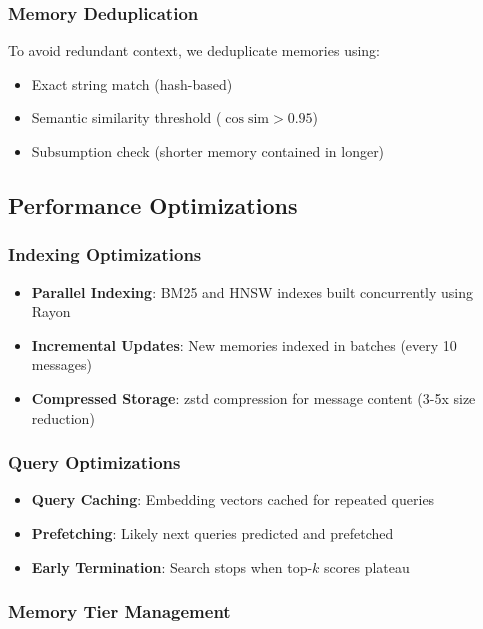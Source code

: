 \subsubsection{Memory Deduplication}

To avoid redundant context, we deduplicate memories using:
\begin{itemize}
    \item Exact string match (hash-based)
    \item Semantic similarity threshold ($\cos \text{sim} > 0.95$)
    \item Subsumption check (shorter memory contained in longer)
\end{itemize}

\subsection{Performance Optimizations}

\subsubsection{Indexing Optimizations}

\begin{itemize}
    \item \textbf{Parallel Indexing}: BM25 and HNSW indexes built concurrently using Rayon
    \item \textbf{Incremental Updates}: New memories indexed in batches (every 10 messages)
    \item \textbf{Compressed Storage}: zstd compression for message content (3-5x size reduction)
\end{itemize}

\subsubsection{Query Optimizations}

\begin{itemize}
    \item \textbf{Query Caching}: Embedding vectors cached for repeated queries
    \item \textbf{Prefetching}: Likely next queries predicted and prefetched
    \item \textbf{Early Termination}: Search stops when top-$k$ scores plateau
\end{itemize}

\subsubsection{Memory Tier Management}

